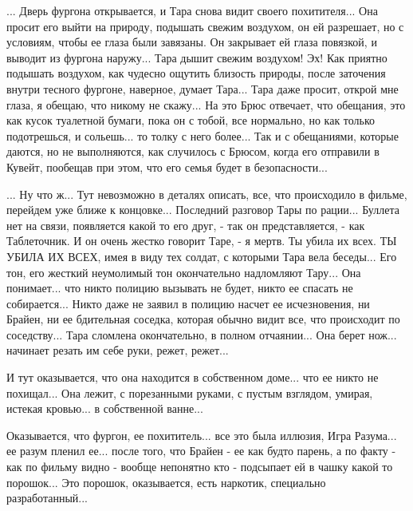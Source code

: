 ... Дверь фургона открывается, и Тара снова видит своего похитителя... Она просит его
выйти на природу, подышать свежим воздухом, он ей разрешает, но с условиям, чтобы ее глаза
были завязаны. Он закрывает ей глаза повязкой, и выводит из фургона наружу... Тара
дышит свежим воздухом! Эх! Как приятно подышать воздухом, как чудесно ощутить близость природы,
после заточения внутри тесного фургоне, наверное, думает Тара... Тара даже просит, открой мне глаза,
я обещаю, что никому не скажу... На это Брюс отвечает, что обещания, это как кусок туалетной бумаги,
пока он с тобой, все нормально, но как только подотрешься, и сольешь... то толку с него более...
Так и с обещаниями, которые даются, но не выполняются, как случилось с Брюсом, когда его отправили в Кувейт,
пообещав при этом, что его семья будет в безопасности... 

... Ну что ж... Тут невозможно в деталях описать, все, что происходило в
фильме, перейдем уже ближе к концовке...  Последний разговор Тары по рации...
Буллета нет на связи, появляется какой то его друг, - так он представляется, -
как Таблеточник. И он очень жестко говорит Таре, - я мертв. Ты убила их всех.
ТЫ УБИЛА ИХ ВСЕХ, имея в виду тех солдат, с которыми Тара вела беседы... Его
тон, его жесткий неумолимый тон окончательно надломляют Тару...  Она
понимает... что никто полицию вызывать не будет, никто ее спасать не
собирается... Никто даже не заявил в полицию насчет ее исчезновения, ни Брайен,
ни ее бдительная соседка, которая обычно видит все, что происходит по
соседству...  Тара сломлена окончательно, в полном отчаянии...  Она берет
нож... начинает резать им себе руки, режет, режет...

И тут оказывается, что она находится в собственном доме... что ее никто не
похищал...  Она лежит, с порезанными руками, с пустым взглядом, умирая, истекая
кровью... в собственной ванне... 

Оказывается, что фургон, ее похититель... все это была иллюзия, Игра Разума...
ее разум пленил ее...  после того, что Брайен - ее как будто парень, а по факту
- как по фильму видно - вообще непонятно кто - подсыпает ей в чашку какой то
порошок... Это порошок, оказывается, есть наркотик, специально разработанный...

